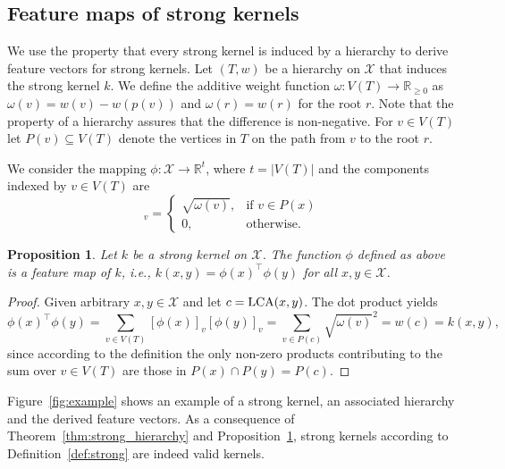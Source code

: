 \documentclass{article}
\newtheorem{proposition}{Proposition}
\newcommand{\tp}[0]{\top}
\newcommand{\X}{\ensuremath{\mathcal{X}}\xspace}
\newcommand{\bbR}[0]{\ensuremath{\mathbb{R}}\xspace}
\newcommand{\bbRnn}[0]{\ensuremath{\mathbb{R}_{\geq0}}\xspace}
\begin{document}
\subsection{Feature maps of strong kernels}\label{sec:strong:feature_maps}

We use the property that every strong kernel is induced by a hierarchy to derive
feature vectors for strong kernels.
Let $(T,w)$ be a hierarchy on \X that induces the strong kernel $k$. We define 
the additive weight function $\omega : V(T) \to \bbRnn$ as
$\omega(v) = w(v)-w(p(v))$ and $\omega(r) = w(r)$ for the root $r$. 
Note that the property of a hierarchy assures that the difference is non-negative.
For $v \in V(T)$ let $P(v) \subseteq V(T)$ denote the vertices in $T$ on
the path from $v$ to the root $r$.

We consider the mapping $\phi : \X \to \bbR^t$, where $t = |V(T)|$ and
the components indexed by $v \in V(T)$ are
\begin{equation*}
 [\phi(x)]_v = 
 \begin{cases}
   \sqrt{\omega(v)},  & \text{if } v \in P(x) \\
   0,                 & \text{otherwise.}
 \end{cases}
\end{equation*}
\begin{proposition}\label{prop:strong:feature_map}
 Let $k$ be a strong kernel on \X. The function $\phi$ defined as 
 above is a feature map of $k$, i.e., $k(x,y) = \phi(x)^\tp \phi(y)$ for all 
 $x,y \in \X$.
\end{proposition}
\begin{proof}
 Given arbitrary $x,y \in \X$ and let $c={\rm LCA}(x,y)$.
 The dot product yields 
 \begin{equation*}
  \phi(x)^\tp \phi(y) = 
  \sum_{v \in V(T)} [\phi(x)]_v [\phi(y)]_v =
  \sum_{v \in P(c)} \sqrt{\omega(v)}^2 = 
  w(c) = k(x,y),
 \end{equation*}
 since according to the definition the only non-zero products contributing to the 
 sum over $v \in V(T)$ are those in $P(x) \cap P(y) = P(c)$. 
\end{proof}

Figure~\ref{fig:example} shows an example of a strong kernel, an associated 
hierarchy and the derived feature vectors.
As a consequence of Theorem~\ref{thm:strong_hierarchy} and 
Proposition~\ref{prop:strong:feature_map}, strong kernels according to Definition~\ref{def:strong} are indeed valid kernels.
\end{document}
